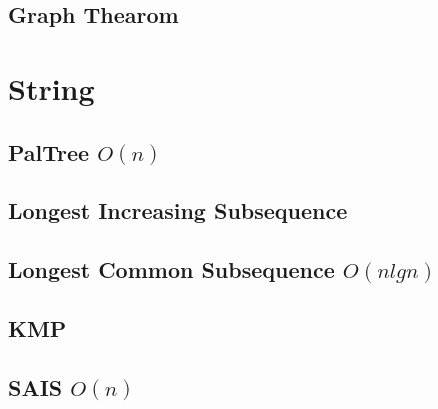 \documentclass[a4paper,10pt,twocolumn,oneside]{article}
\begin{document}
\subsection{Graph Thearom}


%

% 

\section{String}

\subsection{PalTree $O(n)$}


%

\subsection{Longest Increasing Subsequence}



\subsection{Longest Common Subsequence $O(nlgn)$}


\subsection{KMP}


\subsection{SAIS $O(n)$}

\end{document}
